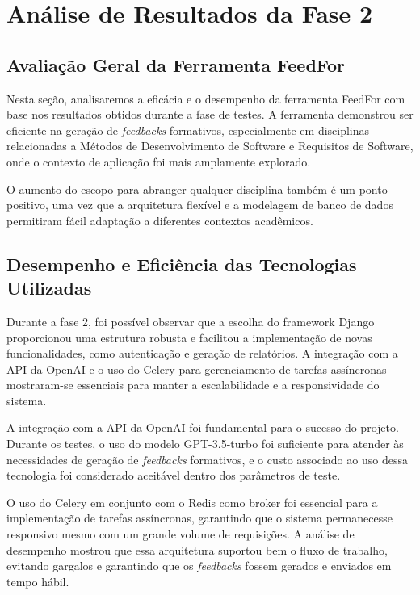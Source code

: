\chapter{Análise de Resultados da Fase 2}

\section{Avaliação Geral da Ferramenta FeedFor}

Nesta seção, analisaremos a eficácia e o desempenho da ferramenta FeedFor com base nos resultados obtidos durante a fase de testes. A ferramenta demonstrou ser eficiente na geração de \textit{feedbacks} formativos, especialmente em disciplinas relacionadas a Métodos de Desenvolvimento de Software e Requisitos de Software, onde o contexto de aplicação foi mais amplamente explorado.

O aumento do escopo para abranger qualquer disciplina também é um ponto positivo, uma vez que a arquitetura flexível e a modelagem de banco de dados permitiram fácil adaptação a diferentes contextos acadêmicos.

\section{Desempenho e Eficiência das Tecnologias Utilizadas}

Durante a fase 2, foi possível observar que a escolha do framework Django proporcionou uma estrutura robusta e facilitou a implementação de novas funcionalidades, como autenticação e geração de relatórios. A integração com a API da OpenAI e o uso do Celery para gerenciamento de tarefas assíncronas mostraram-se essenciais para manter a escalabilidade e a responsividade do sistema.

A integração com a API da OpenAI foi fundamental para o sucesso do projeto. Durante os testes, o uso do modelo GPT-3.5-turbo foi suficiente para atender às necessidades de geração de \textit{feedbacks} formativos, e o custo associado ao uso dessa tecnologia foi considerado aceitável dentro dos parâmetros de teste.

O uso do Celery em conjunto com o Redis como broker foi essencial para a implementação de tarefas assíncronas, garantindo que o sistema permanecesse responsivo mesmo com um grande volume de requisições. A análise de desempenho mostrou que essa arquitetura suportou bem o fluxo de trabalho, evitando gargalos e garantindo que os \textit{feedbacks} fossem gerados e enviados em tempo hábil.

